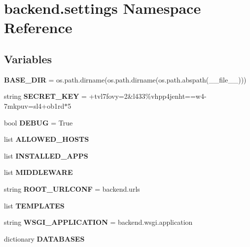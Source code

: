 \hypertarget{namespacebackend_1_1settings}{}\section{backend.\+settings Namespace Reference}
\label{namespacebackend_1_1settings}
\subsection*{Variables}
\begin{DoxyCompactItemize}
\item 
\mbox{\label{namespacebackend_1_1settings_a9af2f83db14ad8f267b0a83c852560d6}} 
{\bfseries B\+A\+S\+E\+\_\+\+D\+IR} = os.\+path.\+dirname(os.\+path.\+dirname(os.\+path.\+abspath(\+\_\+\+\_\+file\+\_\+\+\_\+)))
\item 
\mbox{\label{namespacebackend_1_1settings_ad56ff27cff73da9757e2eefd825818e2}} 
string {\bfseries S\+E\+C\+R\+E\+T\+\_\+\+K\+EY} = \textquotesingle{}+tvl7fovy=2\&l433\%vhpp4jenht==w4-\/7mkpuv=sl4+ob1rd$\ast$5\textquotesingle{}
\item 
\mbox{\label{namespacebackend_1_1settings_ae65752919db4b4e71d597d17430526f2}} 
bool {\bfseries D\+E\+B\+UG} = True
\item 
list {\bfseries A\+L\+L\+O\+W\+E\+D\+\_\+\+H\+O\+S\+TS}
\item 
list {\bfseries I\+N\+S\+T\+A\+L\+L\+E\+D\+\_\+\+A\+P\+PS}
\item 
list {\bfseries M\+I\+D\+D\+L\+E\+W\+A\+RE}
\item 
\mbox{\label{namespacebackend_1_1settings_a8dd1dca9a212ee0aa81e574c0ec359cd}} 
string {\bfseries R\+O\+O\+T\+\_\+\+U\+R\+L\+C\+O\+NF} = \textquotesingle{}backend.\+urls\textquotesingle{}
\item 
list {\bfseries T\+E\+M\+P\+L\+A\+T\+ES}
\item 
\mbox{\label{namespacebackend_1_1settings_a3a5d5bcf59e9b757988305de8e4f6606}} 
string {\bfseries W\+S\+G\+I\+\_\+\+A\+P\+P\+L\+I\+C\+A\+T\+I\+ON} = \textquotesingle{}backend.\+wsgi.\+application\textquotesingle{}
\item 
dictionary {\bfseries D\+A\+T\+A\+B\+A\+S\+ES}

\end{DoxyCompactItemize}
